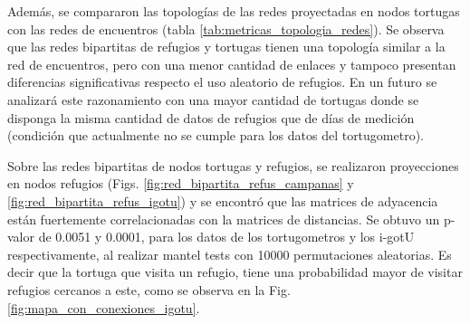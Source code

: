 Además, se compararon las topologías de las redes proyectadas en nodos tortugas con las redes de encuentros (tabla \ref{tab:metricas_topologia_redes}). Se observa que las redes bipartitas de refugios y tortugas tienen una topología similar a la red de encuentros, pero con una menor cantidad de enlaces y tampoco presentan diferencias significativas respecto el uso aleatorio de refugios.  En un futuro se analizará este razonamiento con una mayor cantidad de tortugas donde se disponga la misma cantidad de datos de refugios que de días de medición (condición que actualmente no se cumple para los datos del tortugometro).
 
Sobre las redes bipartitas de nodos tortugas y refugios, se realizaron proyecciones en nodos refugios (Figs. \ref{fig:red_bipartita_refus_campanas} y \ref{fig:red_bipartita_refus_igotu}) y se encontró que las matrices de adyacencia están fuertemente correlacionadas con la matrices de distancias. Se obtuvo un p-valor de 0.0051 y 0.0001, para los datos de los tortugometros y los i-gotU respectivamente, al realizar mantel  tests con 10000 permutaciones aleatorias. Es decir que la tortuga que visita un refugio, tiene una probabilidad mayor de visitar refugios cercanos a este, como se observa en la Fig. \ref{fig:mapa_con_conexiones_igotu}.
 
 
 
 
 
 
 
 
 
 
 
 
 
 

